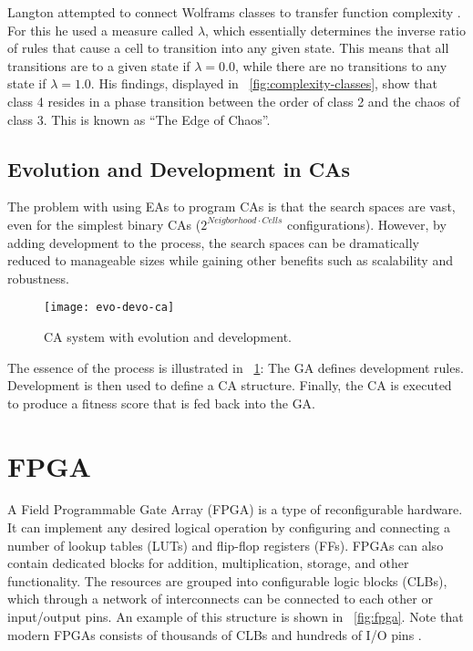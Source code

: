 Langton attempted to connect Wolframs classes to transfer function complexity \cite{langton1990edgeofchaos}.
For this he used a measure called $\lambda$, which essentially determines the inverse ratio of rules that cause a cell to transition into any given state.
This means that all transitions are to a given state if $\lambda=0.0$, while there are no transitions to any state if $\lambda=1.0$.
His findings, displayed in \figurename~\ref{fig:complexity-classes}, show that class 4 resides in a phase transition between the order of class 2 and the chaos of class 3.
This is known as ``The Edge of Chaos''.

\subsection{Evolution and Development in CAs}
\label{sec:evo-devo-ca}

The problem with using EAs to program CAs is that the search spaces are vast, even for the simplest binary CAs ($2^{Neigborhood \cdot Cells}$ configurations\footnotemark).
However, by adding development to the process, the search spaces can be dramatically reduced to manageable sizes while gaining other benefits such as scalability and robustness.


\begin{figure}[!ht]
    \centering
    \texttt{[image: evo-devo-ca]}
    \caption[CA system with evolution and development]{
        CA system with evolution and development.
    }
    \label{fig:evo-devo-ca}
\end{figure}

The essence of the process is illustrated in \figurename~\ref{fig:evo-devo-ca}:
The GA defines development rules.
Development is then used to define a CA structure.
Finally, the CA is executed to produce a fitness score that is fed back into the GA.


\section{FPGA}

A Field Programmable Gate Array (FPGA) is a type of reconfigurable hardware.
It can implement any desired logical operation by configuring and connecting a number of lookup tables (LUTs) and flip-flop registers (FFs).
FPGAs can also contain dedicated blocks for addition, multiplication, storage, and other functionality.
The resources are grouped into configurable logic blocks (CLBs), which through a network of interconnects can be connected to each other or input/output pins.
An example of this structure is shown in \figurename~\ref{fig:fpga}.
Note that modern FPGAs consists of thousands of CLBs and hundreds of I/O pins \cite{ds160}.

